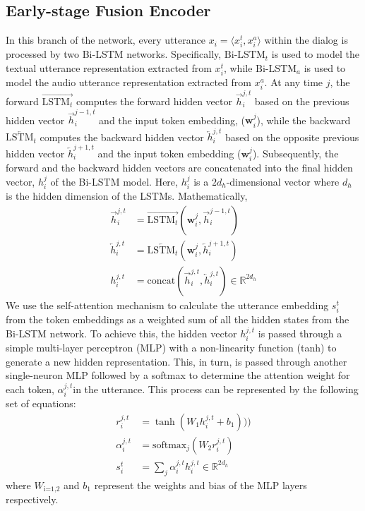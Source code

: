 \subsection{Early-stage Fusion Encoder} 

In this branch of the network, every utterance $x_i = \langle x_{i}^t, x_{i}^a \rangle$ within the dialog is processed by two Bi-LSTM networks.
Specifically, $\text{Bi-LSTM}_{t}$ is used to model the textual utterance representation extracted from $x_{i}^t$, while $\text{Bi-LSTM}_{a}$ is used to model the audio utterance representation extracted from $x_{i}^a$.
At any time $j$, the forward $\overrightarrow{\text{LSTM}_{t}}$ computes the forward hidden vector 
$\overrightarrow{h}_{i}^{j, t}$ based on the previous hidden vector 
$\overrightarrow{h}_{i}^{j-1, t}$ and the input token embedding, ($\mathbf{w}_{i}^{j}$), while the backward $\overleftarrow{\text{LSTM}_{t}}$  computes the backward hidden vector 
$\overleftarrow{h}_{i}^{j, t}$ based on the opposite previous hidden vector $\overleftarrow{h}_{i}^{j+1, t}$ and the input token embedding ($\mathbf{w}_{i}^{j}$).
Subsequently, the forward and the backward hidden vectors are concatenated into the final hidden vector, $h_{i}^{j}$ of the Bi-LSTM model.
Here, $h_{i}^{j}$ is a ${2d_{h}}$-dimensional vector where $d_{h}$ is the hidden dimension of the LSTMs.
Mathematically, 
%
\begin{align}
\overrightarrow{h}_{i}^{j, t} &= \overrightarrow{\text{LSTM}_{t}}(\mathbf{w}_{i}^{j}, \overrightarrow{h}_{i}^{j-1, t}) \tag{1} \\
\overleftarrow{h}_{i}^{j, t} &= \overleftarrow{\text{LSTM}_{t}}(\mathbf{w}_{i}^{j}, \overleftarrow{h}_{i}^{j+1, t}) \tag{2} \\
h_{i}^{j, t} &= \text{concat}(\overrightarrow{h}_{i}^{j, t}, \overleftarrow{h}_{i}^{j, t}) \in \mathbb{R}^{2d_{h}}\tag{3} 
\end{align}
%
We use the self-attention mechanism to calculate the utterance embedding $s_{i}^{t}$ from the token embeddings as a weighted sum of all the hidden states from the Bi-LSTM network. To achieve this, the hidden vector $h_{i}^{j, t}$ is passed through a simple multi-layer perceptron (MLP) with a non-linearity function (tanh) to generate a new hidden representation.
This, in turn, is passed through another single-neuron MLP followed by a softmax to determine the attention weight for each token, $\alpha_{i}^{j, t}$in the utterance.
This process can be represented by the following set of equations:
%
\begin{align}
r_{i}^{j, t} &= \tanh(W_1 h_{i}^{j, t} + b_1)))\\
\alpha_{i}^{j, t} &= \text{softmax}_{j} (W_2 r_{i}^{j, t})\\
s_{i}^{t} &= \sum_j \alpha_{i}^{j, t} h_{i}^{j, t} \in \mathbb{R}^{2d_{h}}
\end{align}
%
where $W_\text{i=1,2}$ and $b_1$ represent the weights and bias of the MLP layers respectively.

